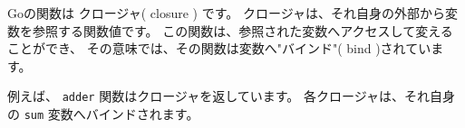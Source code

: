 Goの関数は クロージャ( closure ) です。
クロージャは、それ自身の外部から変数を参照する関数値です。
この関数は、参照された変数へアクセスして変えることができ、
その意味では、その関数は変数へ"バインド"( bind )されています。

例えば、 \texttt{adder} 関数はクロージャを返しています。
各クロージャは、それ自身の \texttt{sum} 変数へバインドされます。